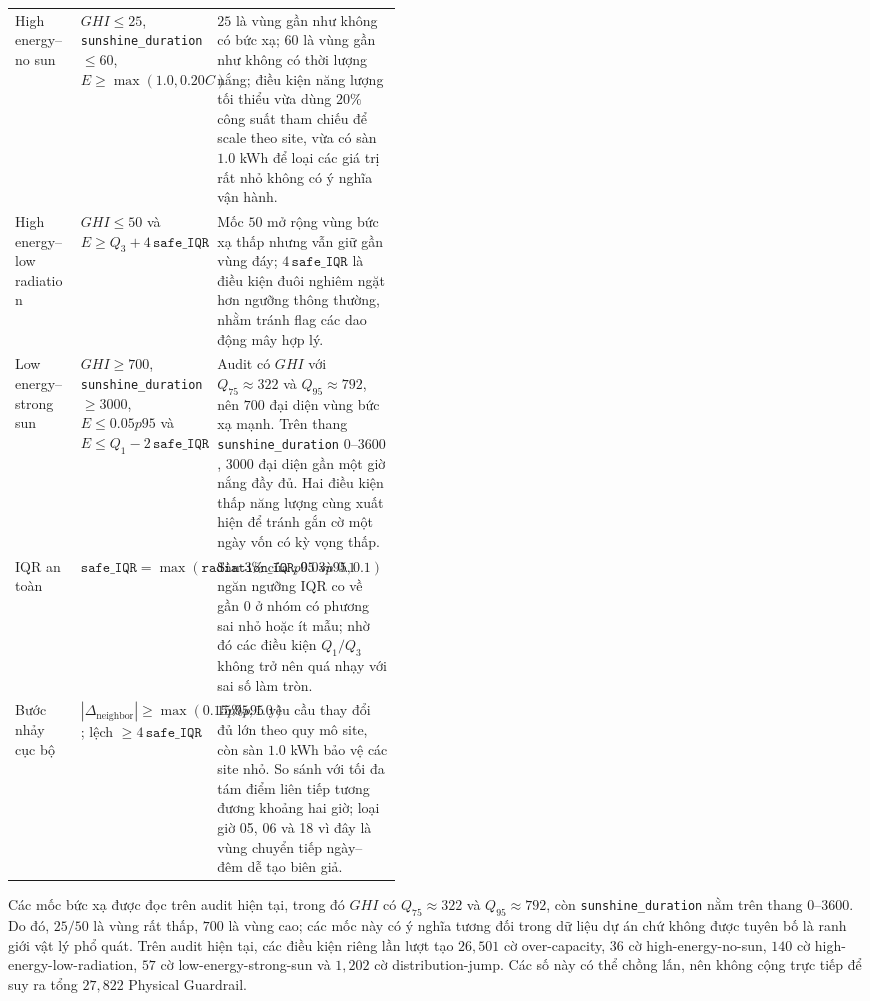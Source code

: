 \documentclass[12pt,a4paper]{article}
\begin{document}
\begin{table}[htbp]
\begin{tabularx}{\linewidth}{>{\raggedright\arraybackslash}p{0.17\linewidth} >{\raggedright\arraybackslash}p{0.28\linewidth} >{\raggedright\arraybackslash}X}
High energy--no sun & $GHI\leq25$, \texttt{sunshine\_duration} $\leq60$, $E\geq\max(1.0,0.20C)$ & $25$ là vùng gần như không có bức xạ; $60$ là vùng gần như không có thời lượng nắng; điều kiện năng lượng tối thiểu vừa dùng $20\%$ công suất tham chiếu để scale theo site, vừa có sàn $1.0$ kWh để loại các giá trị rất nhỏ không có ý nghĩa vận hành. \\
High energy--low radiation & $GHI\leq50$ và $E\geq Q_3+4\,\texttt{safe\_IQR}$ & Mốc $50$ mở rộng vùng bức xạ thấp nhưng vẫn giữ gần vùng đáy; $4\,\texttt{safe\_IQR}$ là điều kiện đuôi nghiêm ngặt hơn ngưỡng thông thường, nhằm tránh flag các dao động mây hợp lý. \\
Low energy--strong sun & $GHI\geq700$, \texttt{sunshine\_duration} $\geq3000$, $E\leq0.05p95$ và $E\leq Q_1-2\,\texttt{safe\_IQR}$ & Audit có $GHI$ với $Q_{75}\approx322$ và $Q_{95}\approx792$, nên $700$ đại diện vùng bức xạ mạnh. Trên thang \texttt{sunshine\_duration} $0$--$3600$, $3000$ đại diện gần một giờ nắng đầy đủ. Hai điều kiện thấp năng lượng cùng xuất hiện để tránh gắn cờ một ngày vốn có kỳ vọng thấp. \\
IQR an toàn & $\texttt{safe\_IQR}=\max(\texttt{radiation\_IQR},0.03p95,0.1)$ & Sàn $3\%$ của $p95$ và $0.1$ ngăn ngưỡng IQR co về gần 0 ở nhóm có phương sai nhỏ hoặc ít mẫu; nhờ đó các điều kiện $Q_1/Q_3$ không trở nên quá nhạy với sai số làm tròn. \\
Bước nhảy cục bộ & $|\Delta_{\text{neighbor}}|\geq\max(0.15p95,1.0)$; lệch $\geq4\,\texttt{safe\_IQR}$ & $15\%p95$ yêu cầu thay đổi đủ lớn theo quy mô site, còn sàn $1.0$ kWh bảo vệ các site nhỏ. So sánh với tối đa tám điểm liên tiếp tương đương khoảng hai giờ; loại giờ 05, 06 và 18 vì đây là vùng chuyển tiếp ngày--đêm dễ tạo biên giả. \\
\bottomrule
\end{tabularx}
\end{table}

Các mốc bức xạ được đọc trên audit hiện tại, trong đó $GHI$ có $Q_{75}\approx322$ và $Q_{95}\approx792$, còn \texttt{sunshine\_duration} nằm trên thang $0$--$3600$. Do đó, $25/50$ là vùng rất thấp, $700$ là vùng cao; các mốc này có ý nghĩa tương đối trong dữ liệu dự án chứ không được tuyên bố là ranh giới vật lý phổ quát. Trên audit hiện tại, các điều kiện riêng lần lượt tạo $26{,}501$ cờ over-capacity, $36$ cờ high-energy-no-sun, $140$ cờ high-energy-low-radiation, $57$ cờ low-energy-strong-sun và $1{,}202$ cờ distribution-jump. Các số này có thể chồng lấn, nên không cộng trực tiếp để suy ra tổng $27{,}822$ Physical Guardrail.
\end{document}
